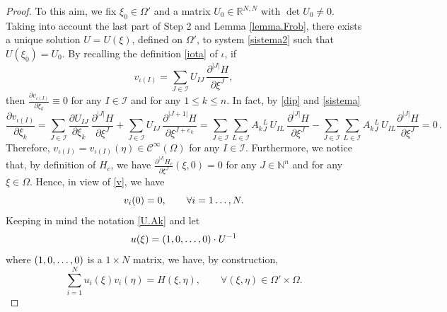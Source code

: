 \documentclass{article}
\newcommand{\I}{\mathcal{I}}
\newcommand{\R}{\mathds{R}}
\newcommand{\de}{\partial}
\newcommand{\N}{\mathds{N}}
\begin{document}
\begin{proof}
\smallskip\noindent
 To this aim,  we fix  $\xi_0\in\Omega'$ and a matrix $U_0\in \R^{N,N}$ with $\det U_0\neq 0$.
Taking into account the last part of Step 2 and Lemma \ref{lemma.Frob}, there exists a unique solution $U=U(\xi)$, defined on  $\Omega'$, to system \eqref{sistema2} such that $U(\xi_0)=U_0$.
By recalling the definition \eqref{iota} of $\iota$, if 
\begin{equation}\label{v}
v_{\iota(I)}=\sum_{J\in\I} U_{IJ}\,  \frac{\de^{|J|} H }{\de\xi^J }, 
\end{equation}
then
$\frac{\de v_{\iota(I)}}{\de \xi_k}\equiv 0$ for any $I\in\I$ and for any $1\leq k\leq n$. In fact, by \eqref{dip} and \eqref{sistema}
$$
\frac{\de v_{\iota(I)}}{\de \xi_k}=\sum_{J\in\I} \frac{\de U_{IJ} }{\de\xi_k }\,\frac{\de^{|J|} H }{\de\xi^J } + \sum_{J\in\I}U_{IJ}\, \frac{\de^{|J+1|}H}{\de\xi^{J+e_k}}
= 
\sum_{J\in\I} \sum_{L\in\I} A_k{}^L_J \,U_{IL}\, \frac{\de^{|J|} H }{\de\xi^J } -\sum_{J\in\I} \sum_{L\in\I}A_k{}^L_J \,U_{IL}\frac{\de^{|J|} H }{\de\xi^J }=0\,.
$$
Therefore, $v_{\iota(I)}=v_{\iota(I)}(\eta)\in\mathcal{C}^\infty(\Omega)$ for any $I\in\I$. {Furthermore, we notice that, by definition of $H_c$, we have $\frac{\de^{|J|} H_c}{\de \xi^J}(\xi,0)=0$ for any $J\in\N^n$ and for any $\xi\in\Omega$. Hence, in view of \eqref{v}, we have
$$v_i(0)=0,\qquad \forall i=1\mathellipsis,N.$$}
Keeping in mind the notation \eqref{U.Ak} and let
\begin{equation}\label{u}
u(\xi)=(1,0,\mathellipsis,0)\cdot  U^{-1}\end{equation}
where $(1,0,\mathellipsis,0)$ is a $1\times N$ matrix, we have, by construction,
\begin{equation}\label{eq}
\sum_{i=1}^N u_i(\xi)v_i(\eta)=H(\xi,\eta),\qquad \forall(\xi,\eta)\in  \Omega'\times \Omega.\end{equation}


\end{proof}
\end{document}
